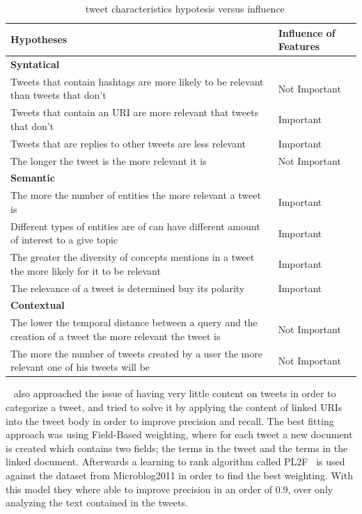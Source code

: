 \begin{table}[tb]
  \caption{~\citet{Tao2012} tweet characteristics hypotesis versus influence}
  \label{tab:tao_table}
  \begin{tabularx}{\textwidth}{|X|l|}
  \hline
  \textbf{Hypotheses} & \textbf{Influence of Features} \\
  \hline
  \hline

  {\bf Syntatical} &  \\
  \hline
  Tweets that contain hashtags are more likely to be relevant than tweets that don't & Not Important \\
  \hline
  Tweets that contain an URI are more relevant that tweets that don't  &Important \\
  \hline
  Tweets that are replies to other tweets are less relevant & Important \\
  \hline
  The longer the tweet is the more relevant it is & Not Important\\
  \hline
  \hline

  {\bf Semantic}  &  \\
  \hline
  
  The more the number of entities the more relevant a tweet is  & Important \\
  \hline
  Different types of entities are of can have different amount of interest to a give topic  & Important \\
  \hline
  The greater the diversity of concepts mentions in a tweet the more likely for it to be relevant & Important \\
  \hline
  The relevance of a tweet is determined buy its polarity & Important \\
  \hline
  \hline

  {\bf Contextual} &  \\
  \hline
  The lower the temporal distance between a query and the creation of a tweet the more relevant the tweet is  & Not Important \\
  \hline
  The more the number of tweets created by a user the more relevant one of his tweets will be & Not Important \\
  \hline
  \end{tabularx}
\end{table}

~\citet{McCreadie2013} also approached the issue of having very little content on tweets in order to categorize a tweet, and tried to solve it by applying the content of linked URIs into the tweet body in order to improve precision and recall. The best fitting approach was using Field-Based weighting, where for each tweet a new document is created which contains two fields; the terms in the tweet and the terms in the linked document. 
Afterwards a learning to rank algorithm called PL2F~\cite{macdonald2006} is used against the dataset from Microblog2011 in order to find the best weighting. 
With this model they where able to improve precision in an order of 0.9, over only analyzing the text contained in the tweets. 

